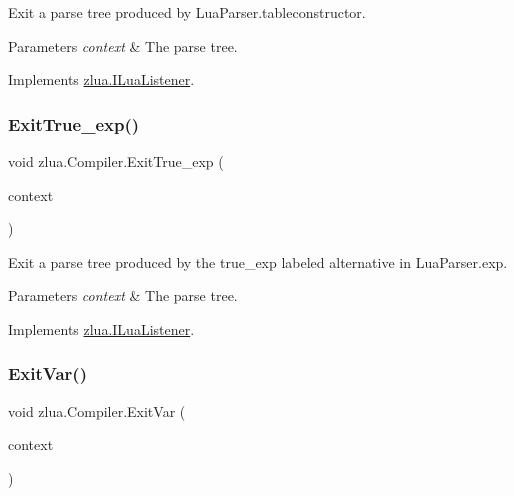 Exit a parse tree produced by Lua\+Parser.\+tableconstructor. 


\begin{DoxyParams}{Parameters}
{\em context} & The parse tree.\\
\hline
\end{DoxyParams}


Implements \mbox{\hyperlink{interfacezlua_1_1_i_lua_listener_ae19198d7c5130d70ca8ffa5ff81c168e}{zlua.\+I\+Lua\+Listener}}.

\mbox{\label{classzlua_1_1_compiler_a4f3853e4033fb51cb2d9c63cdd66e1ae}} 
\subsubsection{\texorpdfstring{Exit\+True\+\_\+exp()}{ExitTrue\_exp()}}
{\footnotesize\ttfamily void zlua.\+Compiler.\+Exit\+True\+\_\+exp (\begin{DoxyParamCaption}\item[{\mbox{[}\+Not\+Null\mbox{]} \mbox{\hyperlink{classzlua_1_1_lua_parser_1_1_true__exp_context}{Lua\+Parser.\+True\+\_\+exp\+Context}}}]{context }\end{DoxyParamCaption})}



Exit a parse tree produced by the {\ttfamily true\+\_\+exp} labeled alternative in Lua\+Parser.\+exp. 


\begin{DoxyParams}{Parameters}
{\em context} & The parse tree.\\
\hline
\end{DoxyParams}


Implements \mbox{\hyperlink{interfacezlua_1_1_i_lua_listener_a9d5a4a9bd56969dc9b5269fd3049187d}{zlua.\+I\+Lua\+Listener}}.

\mbox{\label{classzlua_1_1_compiler_ac7ccb4c59166208993e3a32b470cc7bf}} 
\subsubsection{\texorpdfstring{Exit\+Var()}{ExitVar()}}
{\footnotesize\ttfamily void zlua.\+Compiler.\+Exit\+Var (\begin{DoxyParamCaption}\item[{\mbox{[}\+Not\+Null\mbox{]} \mbox{\hyperlink{classzlua_1_1_lua_parser_1_1_var_context}{Lua\+Parser.\+Var\+Context}}}]{context }\end{DoxyParamCaption})}



